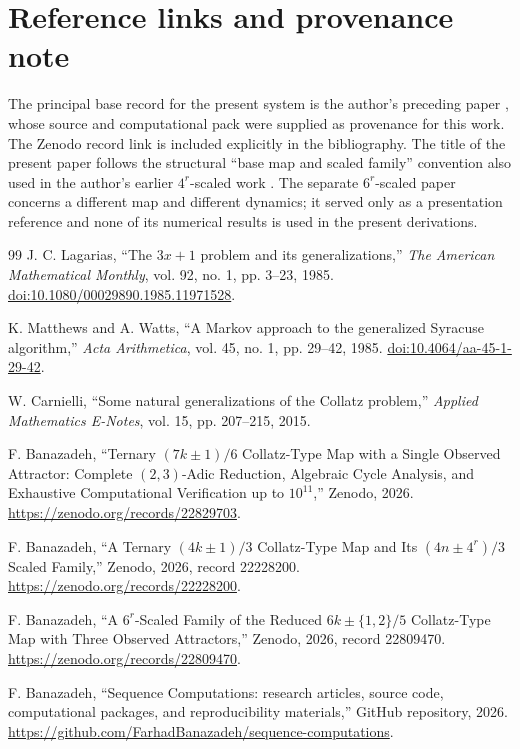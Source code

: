 \documentclass[11pt]{article}
\begin{document}
\section{Reference links and provenance note}
The principal base record for the present system is the author's preceding paper \cite{Base7Paper}, whose source and computational pack were supplied as provenance for this work. The Zenodo record link is included explicitly in the bibliography. The title of the present paper follows the structural ``base map and scaled family'' convention also used in the author's earlier $4^r$-scaled work \cite{Scaled4Paper}. The separate $6^r$-scaled paper \cite{Scaled6Paper} concerns a different map and different dynamics; it served only as a presentation reference and none of its numerical results is used in the present derivations.

\begin{thebibliography}{99}
J. C. Lagarias,
``The $3x+1$ problem and its generalizations,''
\emph{The American Mathematical Monthly}, vol. 92, no. 1, pp. 3--23, 1985.
\href{https://doi.org/10.1080/00029890.1985.11971528}{doi:10.1080/00029890.1985.11971528}.

K. Matthews and A. Watts,
``A Markov approach to the generalized Syracuse algorithm,''
\emph{Acta Arithmetica}, vol. 45, no. 1, pp. 29--42, 1985.
\href{https://doi.org/10.4064/aa-45-1-29-42}{doi:10.4064/aa-45-1-29-42}.

W. Carnielli,
``Some natural generalizations of the Collatz problem,''
\emph{Applied Mathematics E-Notes}, vol. 15, pp. 207--215, 2015.

F. Banazadeh,
``Ternary $(7k\pm1)/6$ Collatz-Type Map with a Single Observed Attractor: Complete $(2,3)$-Adic Reduction, Algebraic Cycle Analysis, and Exhaustive Computational Verification up to $10^{11}$,''
Zenodo, 2026.
\href{https://zenodo.org/records/22829703}{https://zenodo.org/records/22829703}.

F. Banazadeh,
``A Ternary $(4k\pm1)/3$ Collatz-Type Map and Its $(4n\pm4^r)/3$ Scaled Family,''
Zenodo, 2026, record 22228200.
\href{https://zenodo.org/records/22228200}{https://zenodo.org/records/22228200}.

F. Banazadeh,
``A $6^r$-Scaled Family of the Reduced $6k\pm\{1,2\}/5$ Collatz-Type Map with Three Observed Attractors,''
Zenodo, 2026, record 22809470.
\href{https://zenodo.org/records/22809470}{https://zenodo.org/records/22809470}.

F. Banazadeh,
``Sequence Computations: research articles, source code, computational packages, and reproducibility materials,''
GitHub repository, 2026.
\href{https://github.com/FarhadBanazadeh/sequence-computations}{https://github.com/FarhadBanazadeh/sequence-computations}.
\end{thebibliography}
\end{document}
